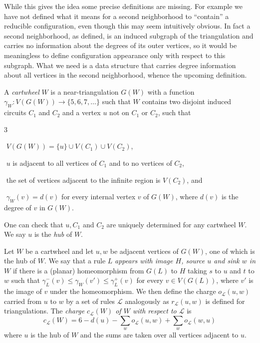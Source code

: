 \documentclass[11pt]{article}
\newcommand{\mcal}{\mathcal}
\newcommand{\gm}{\gamma}
\begin{document}
While this gives the idea some precise definitions are missing. For example we have not defined what it means for a second neighborhood to ``contain'' a reducible configuration, even though this may seem intuitively obvious. In fact a second neighborhood, as defined, is an induced subgraph of the triangulation and carries no information about the degrees of its outer vertices, so it would be meaningless to define configuration appearance only with respect to this subgraph. What we need is a data structure that carries degree information about all vertices in the second neighborhood, whence the upcoming definition.

A \emph{cartwheel} $W$ is a near-triangulation $G(W)$ with a function $\gm_W: V(G(W)) \rightarrow \{5, 6, 7, \ldots \}$ such that $W$ contains two disjoint induced circuits $C_1$ and $C_2$ and a vertex $u$ not on $C_1$ or $C_2$, such that

	  {
	  \renewcommand{\theenumi}{\arabic{enumi}}
	  \renewcommand{\labelenumi}{(\theenumi)}
	  \begin{list}{3}{
	    \setlength{\itemindent}{42pt}
	    \setlength{\itemsep}{0pt}
	    \setlength{\parskip}{-5pt}
            \setlength{\leftmargin}{0pt}}

\item[(i)\hfill] $\!\!\!\!\!$ $V(G(W)) = \{u\} \cup V(C_1) \cup V(C_2)$,

\item[(ii)\hfill] $\!\!\!\!\!$ $u$ is adjacent to all vertices of $C_1$ and to no vertices of $C_2$,

\item[(iii)\hfill] $\!\!\!\!\!$ the set of vertices adjacent to the infinite region is $V(C_2)$, and

\item[(iv)\hfill] $\!\!\!\!\!$ $\gm_W(v) = d(v)$ for every internal vertex $v$ of $G(W)$, where $d(v)$ is the degree of $v$ in $G(W)$.
\end{list}
}

\noindent One can check that $u, C_1$ and $C_2$ are uniquely determined for any cartwheel $W$. We say $u$ is the \emph{hub} of $W$.

Let $W$ be a cartwheel and let $u, w$ be adjacent vertices of $G(W)$, one of which is the hub of $W$. We say that a rule $L$ \emph{appears with image $H$, source $u$ and sink $w$ in $W$} if there is a (planar) homeomorphism from $G(L)$ to $H$ taking $s$ to $u$ and $t$ to $w$ such that 
$\gm_L^-(v) \leq \gm_W(v') \leq \gm_L^+(v)$ for every $v \in V(G(L))$, where $v'$ is the image of $v$ under the homeomorphism. We then define the charge $o_{\mcal{L}}(u,w)$ carried from $u$ to $w$ by a set of rules $\mcal{L}$ analogously as $r_\mcal{L}(u,w)$ is defined for triangulations. The \emph{charge $c_{\mcal{L}}(W)$ of $W$ with respect to $\mcal{L}$} is 
$$
c_{\mcal{L}}(W) = 6 - d(u) - \sum_{w}o_\mcal{L}(u,w) + \sum_wo_\mcal{L}(w,u)
$$
where $u$ is the hub of $W$ and the sums are taken over all vertices adjacent to $u$.
\end{document}
